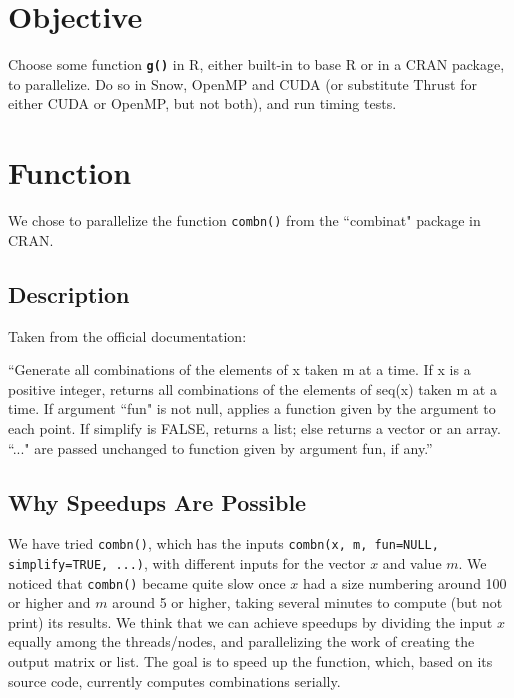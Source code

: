 \documentclass[12pt]{article}
\begin{document}
\raggedright{



\tableofcontents

\newpage


\section{Objective}
Choose some function \textbf{\texttt{g()}} in R, either built-in to base R or in a CRAN package, to parallelize. Do so in Snow, OpenMP and CUDA (or substitute Thrust for either CUDA or OpenMP, but not both), and run timing tests.

\section{Function}
We chose to parallelize the function \texttt{combn()} from the ``combinat" package in CRAN.
\subsection{Description}
Taken from the official documentation:\cite{crandoc}\\
\null
\begin{adjustwidth}{2em}{0pt}
``Generate all combinations of the elements of x taken m at a time. If x is a positive integer, returns
all combinations of the elements of seq(x) taken m at a time. If argument ``fun" is not null, applies
a function given by the argument to each point. If simplify is FALSE, returns a list; else returns a
vector or an array. ``..." are passed unchanged to function given by argument fun, if any.''
\end{adjustwidth}

\subsection{Why Speedups Are Possible}

We have tried \texttt{combn()}, which has the inputs \texttt{combn(x, m, fun=NULL, simplify=TRUE, ...)}, with different inputs for the vector $x$ and value $m$. We noticed that \texttt{combn()} became quite slow once $x$ had a size numbering around 100 or higher and $m$ around 5 or higher, taking several minutes to compute (but not print) its results. We think that we can achieve speedups by dividing the input $x$ equally among the threads/nodes, and parallelizing the work of creating the output matrix or list. The goal is to speed up the function, which, based on its source code, currently computes combinations serially.    

}
\end{document}
